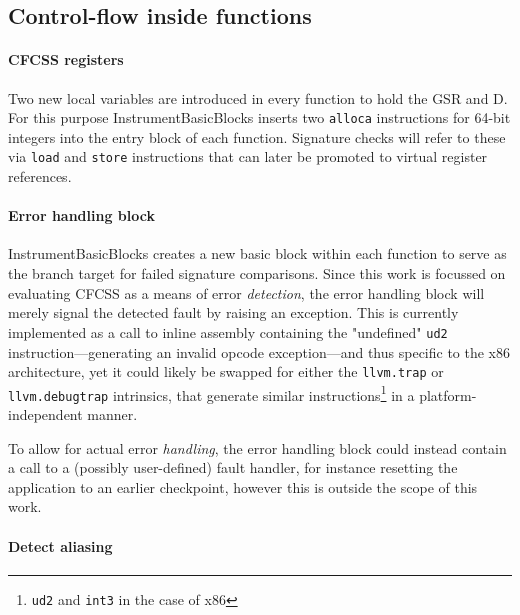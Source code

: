 
\subsection{Control-flow inside functions}

\paragraph{CFCSS registers}

Two new local variables are introduced in every function to hold the GSR and D.
For this purpose InstrumentBasicBlocks inserts two \texttt{alloca} instructions
for 64-bit integers into the entry block of each function.  Signature checks
will refer to these via \texttt{load} and \texttt{store} instructions that can
later be promoted to virtual register references.

\paragraph{Error handling block}

 InstrumentBasicBlocks creates a new
basic block within each function to serve as the branch target for failed
signature comparisons. Since this work is focussed on evaluating CFCSS as
a means of error \emph{detection}, the error handling block will merely signal
the detected fault by raising an exception.  This is currently implemented as
a call to inline assembly containing the "undefined" \texttt{ud2}
instruction—generating an invalid opcode exception—and thus specific to the x86
architecture, yet it could likely be swapped for either the \texttt{llvm.trap}
or \texttt{llvm.debugtrap} intrinsics, that generate similar
instructions\footnote{\texttt{ud2} and \texttt{int3} in the case of x86} in
a platform-independent manner.

To allow for actual error \emph{handling}, the error handling block could
instead contain a call to a (possibly user-defined) fault handler, for instance
resetting the application to an earlier checkpoint, however this is outside the
scope of this work.


\paragraph{Detect aliasing}

